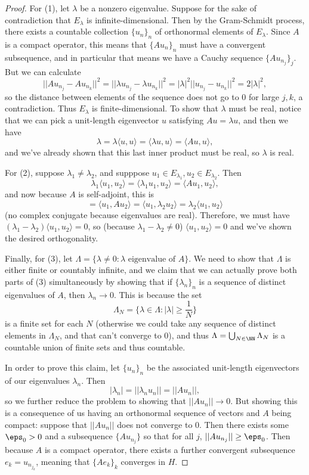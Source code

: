 \begin{proof}
For (1), let $\lambda$ be a nonzero eigenvalue. Suppose for the sake of contradiction that $E_\lambda$ is infinite-dimensional. Then by the Gram-Schmidt process, there exists a countable collection $\{u_n\}_n$ of orthonormal elements of $E_{\lambda}$. Since $A$ is a compact operator, this means that $\{Au_n\}_n$ must have a convergent subsequence, and in particular that means we have a Cauchy sequence $\{Au_{n_j}\}_j$. But we can calculate
\[
    ||Au_{n_j} - Au_{n_k}||^2 = ||\lambda u_{n_j} - \lambda u_{n_k}||^2 = |\lambda|^2 ||u_{n_j} - u_{n_k}||^2 = 2|\lambda|^2,
\]
so the distance between elements of the sequence does not go to $0$ for large $j, k$, a contradiction. Thus $E_\lambda$ is finite-dimensional. To show that $\lambda$ must be real, notice that we can pick a unit-length eigenvector $u$ satisfying $Au = \lambda u$, and then we have
\[
    \lambda = \lambda \langle u, u \rangle = \langle \lambda u, u \rangle = \langle Au, u \rangle,
\]
and we've already shown that this last inner product must be real, so $\lambda$ is real.

For (2), suppose $\lambda_1 \ne \lambda_2$, and supppose $u_1 \in E_{\lambda_1}, u_2 \in E_{\lambda_2}$. Then 
\[
    \lambda_1 \langle u_1, u_2 \rangle = \langle \lambda_1 u_1, u_2 \rangle = \langle Au_1, u_2 \rangle,
\]
and now because $A$ is self-adjoint, this is 
\[
    = \langle u_1, Au_2 \rangle = \langle u_1, \lambda_2 u_2 \rangle = \lambda_2 \langle u_1, u_2 \rangle
\]
(no complex conjugate because eigenvalues are real). Therefore, we must have $(\lambda_1 - \lambda_2) \langle u_1, u_2 \rangle = 0$, so (because $\lambda_1 - \lambda_2 \ne 0$) $\langle u_1, u_2 \rangle = 0$ and we've shown the desired orthogonality. 

Finally, for (3), let $\Lambda = \{\lambda \ne 0: \lambda \text{ eigenvalue of }A\}$. We need to show that $\Lambda$ is either finite or countably infinite, and we claim that we can actually prove both parts of (3) simultaneously by showing that if $\{\lambda_n\}_n$ is a sequence of distinct eigenvalues of $A$, then $\lambda_n \to 0$. This is because the set
\[
    \Lambda_N = \{\lambda \in \Lambda: |\lambda| \ge \frac{1}{N}\}
\]
is a finite set for each $N$ (otherwise we could take any sequence of distinct elements in $\Lambda_N$, and that can't converge to $0$), and thus $\Lambda = \bigcup_{N \in \NN} \Lambda_N$ is a countable union of finite sets and thus countable. 

In order to prove this claim, let $\{u_n\}_n$ be the associated unit-length eigenvectors of our eigenvalues $\lambda_n$. Then 
\[
    |\lambda_n| = ||\lambda_n u_n|| = ||Au_n||,
\]
so we further reduce the problem to showing that $||Au_n|| \to 0$. But showing this is a consequence of us having an orthonormal sequence of vectors and $A$ being compact: suppose that $||Au_n||$ does not converge to $0$. Then there exists some $\eps_0 > 0$ and a subsequence $\{Au_{n_j}\}$ so that for all $j$, $||Au_{n_j}|| \ge \eps_0$. Then because $A$ is a compact operator, there exists a further convergent subsequence $e_k = u_{n_{j_k}}$, meaning that $\{Ae_k\}_k$ converges in $H$. 


\end{proof}
